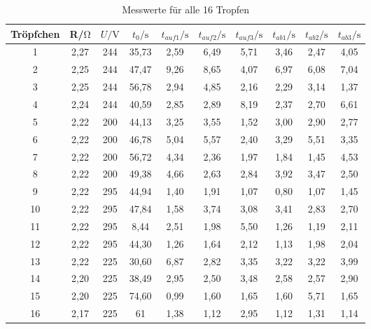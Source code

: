 \begin{table}[H]
    \centering
    \caption{Messwerte für alle 16 Tropfen}
    \label{tab:Messwerte}
    \begin{tabular}{S[table-format=2] S[table-format=1.2] S[table-format=3] S[table-format=2.2]S[table-format=1.2]S[table-format=1.2]S[table-format=1.2]S[table-format=1.2]S[table-format=1.2]S[table-format=1.2]}
        \toprule
        {Tröpfchen}&{R/$\unit{\ohm}$}&{$U/\unit{\volt}$}&{$t_0/\unit{\s}$}&{$t_{auf1}/\unit{\s}$}&{$t_{auf2}/\unit{\s}$}&{$t_{auf3}/\unit{\s}$}&{$t_{ab1}/\unit{\s}$}&{$t_{ab2}/\unit{\s}$}&{$t_{ab3}/\unit{\s}$}\\
         & 2,27 & 244 & 35,73 & 2,59 & 6,49 & 5,71 & 3,46 & 2,47 & 4,05 \\
        2 & 2,25 & 244 & 47,47 & 9,26 & 8,65 & 4,07 & 6,97 & 6,08 & 7,04 \\
        3 & 2,25 & 244 & 56,78 & 2,94 & 4,85 & 2,16 & 2,29 & 3,14 & 1,37 \\
        4 & 2,24 & 244 & 40,59 & 2,85 & 2,89 & 8,19 & 2,37 & 2,70 & 6,61 \\
        5 & 2,22 & 200 & 44,13 & 3,25 & 3,55 & 1,52 & 3,00 & 2,90 & 2,77 \\
        6 & 2,22 & 200 & 46,78 & 5,04 & 5,57 & 2,40 & 3,29 & 5,51 & 3,35 \\
        7 & 2,22 & 200 & 56,72 & 4,34 & 2,36 & 1,97 & 1,84 & 1,45 & 4,53 \\
        8 & 2,22 & 200 & 49,38 & 4,66 & 2,63 & 2,84 & 3,92 & 3,47 & 2,50 \\
        9 & 2,22 & 295 & 44,94 & 1,40 & 1,91 & 1,07 & 0,80 & 1,07 & 1,45 \\
        10 & 2,22 & 295 & 47,84 & 1,58 & 3,74 & 3,08 & 3,41 & 2,83 & 2,70 \\
        11 & 2,22 & 295 & 8,44 & 2,51 & 1,98 & 5,50 & 1,26 & 1,19 & 2,11 \\
        12 & 2,22 & 295 & 44,30 & 1,26 & 1,64 & 2,12 & 1,13 & 1,98 & 2,04 \\
        13 & 2,22 & 225 & 30,60 & 6,87 & 2,82 & 3,35 & 3,22 & 3,22 & 3,99 \\
        14 & 2,20 & 225 & 38,49 & 2,95 & 2,50 & 3,48 & 2,58 & 2,57 & 2,90 \\
        15 & 2,20 & 225 & 74,60 & 0,99 & 1,60 & 1,65 & 1,60 & 5,71 & 1,65 \\
        16 & 2,17 & 225 & 61 & 1,38 & 1,12 & 2,95 & 1,12 & 1,31 & 1,14 \\
        \bottomrule
    \end{tabular}
  \end{table}

